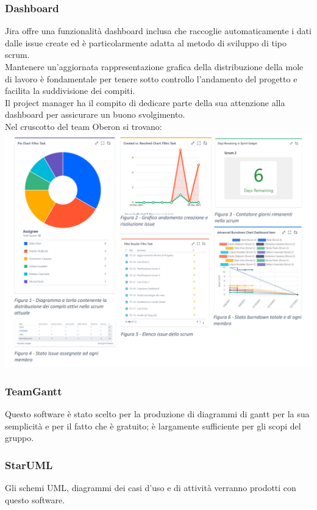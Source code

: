 \subsubsection*{Dashboard}
Jira offre una funzionalità dashboard inclusa che raccoglie automaticamente i dati dalle issue create ed è particolarmente adatta al metodo di sviluppo di tipo scrum.\\ Mantenere un'aggiornata rappresentazione grafica della distribuzione della mole di lavoro è fondamentale per tenere sotto controllo l'andamento del progetto e facilita la suddivisione dei compiti. \\[0.1cm]
Il project manager ha il compito di dedicare parte della sua attenzione alla dashboard per assicurare un buono svolgimento. \\[0.1cm]
Nel cruscotto del team Oberon si trovano: 
\newline
\noindent
\includegraphics[scale=0.55]{img/imgDashboard.PNG}

\subsubsection{TeamGantt}
Questo software è stato scelto per la produzione di diagrammi di gantt per la sua semplicità e per il fatto che è gratuito; è largamente sufficiente per gli scopi del gruppo.
\subsubsection{StarUML}
Gli schemi UML, diagrammi dei casi d'uso e di attività verranno prodotti con questo software.

